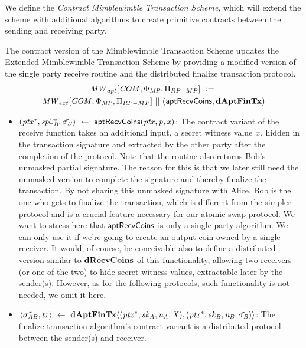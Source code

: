 We define the \emph{Contract Mimblewimble Transaction Scheme}, which will extend the scheme with additional algorithms to create primitive contracts between the sending and receiving party.

\begin{definition}
    \label{def:atom:apt-ext-mw-tx-scheme}
    The contract version of the Mimblewimble Transaction Scheme updates the Extended Mimblewimble Transaction Scheme by providing a modified version of the single party receive routine and the distributed finalize transaction protocol.
    \begin{gather*}
        \mathit{MW}_{apt}[\mathit{COM},\Phi_{\mathit{MP}},\Pi_{RP-MP}] ~:=~ \\ \mathit{MW}_{ext}[\mathit{COM},\Phi_{\mathit{MP}},\Pi_{RP-MP}] ~||~ (\mathsf{aptRecvCoins}, \mathbf{dAptFinTx})
    \end{gather*}
    \begin{itemize}
        \item $(\mathit{ptx}^*, \mathit{sp}\mathcal{C}_{\mathit{B}}^*, \tilde{\sigma_{\mathit{B}}}) ~\leftarrow~ \mathsf{aptRecvCoins}(\mathit{ptx},\mathit{p},\mathit{x})$: The contract variant of the receive function takes an additional input, a secret witness value
        $\mathit{x}$, hidden in the transaction signature and extracted by the other party after the completion of the protocol.
        Note that the routine also returns Bob's unmasked partial signature.
        The reason for this is that we later still need the unmasked version to complete the signature and thereby finalize the transaction.
        By not sharing this unmasked signature with Alice, Bob is the one who gets to finalize the transaction, which is different from the simpler protocol and is a crucial feature necessary for our atomic swap protocol.
        We want to stress here that $\mathsf{aptRecvCoins}$ is only a single-party algorithm.
        We can only use it if we're going to create an output coin owned by a single receiver.
        It would, of course, be conceivable also to define a distributed version similar to $\mathbf{dRecvCoins}$ of this functionality, allowing two receivers (or one of the two) to hide secret witness values, extractable later by the sender(s).
        However, as for the following protocols, such functionality is not needed, we omit it here.
        \item $\langle \tilde{\sigma_{\mathit{A}\mathit{B}}}, \mathit{tx} \rangle ~\leftarrow~ \mathbf{dAptFinTx} \langle (\mathit{ptx}^*,\mathit{sk}_{\mathit{A}},\mathit{\mathit{n}_{\mathit{A}}},\mathit{X}), (\mathit{ptx}^*,\mathit{sk}_{\mathit{B}},\mathit{\mathit{n}_{\mathit{B}}},\tilde{\sigma_{\mathit{B}}}) \rangle$: The finalize transaction algorithm's contract variant is a distributed protocol between the sender(s) and receiver.

\end{itemize}
\end{definition}
